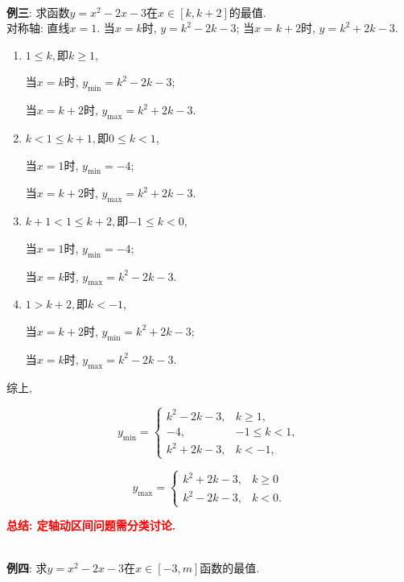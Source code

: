 \documentclass[8pt]{article}
\begin{document}
				~\\

				\textbf{例三}: 求函数$y=x^2-2x-3$在$x\in[k, k+2]$的最值.
					~\\

					对称轴: 直线$x=1$. 当$x=k$时, $y=k^2-2k-3$; 当$x=k+2$时, $y=k^2+2k-3$.

					\begin{enumerate}[label=$\arabic*^{\circ}$]
						\item $1\leq k, $即$k\geq 1$,

							当$x=k$时, $y_{\min}=k^2-2k-3$;

							当$x=k+2$时, $y_{\max}=k^2+2k-3$.

						\item $k<1\leq k+1, $即$0\leq k<1$,

							当$x=1$时, $y_{\min}=-4$;

							当$x=k+2$时, $y_{\max}=k^2+2k-3$.

						\item $k+1<1\leq k+2, $即$-1\leq k<0$,

							当$x=1$时, $y_{\min}=-4$;

							当$x=k$时, $y_{\max}=k^2-2k-3$.

						\item $1>k+2, $即$k<-1$,

							当$x=k+2$时, $y_{\min}=k^2+2k-3$;

							当$x=k$时, $y_{\max}=k^2-2k-3$.
					\end{enumerate}

					综上,

					$$
					y_{\min}=\left\{\begin{array}{rl}k^2-2k-3,& k\geq 1,\\ -4,& -1\leq k<1,\\ k^2+2k-3, &k<-1,\end{array}\right.
					$$

					$$
					y_{\max}=\left\{\begin{array}{rl}k^2+2k-3,& k\geq 0\\ k^2-2k-3, &k<0. \end{array}\right.
					$$

					\textbf{\textcolor{red}{总结: 定轴动区间问题需分类讨论.}}

				~\\

				\textbf{例四}: 求$y=x^2-2x-3$在$x\in[-3, m]$函数的最值.
					~\\
\end{document}
